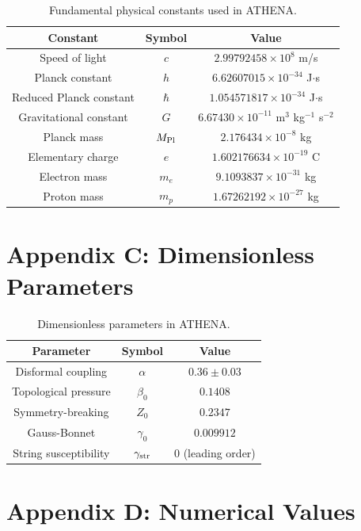 \documentclass[12pt,oneside]{book}
\begin{document}
\begin{table}[H]
\centering
\begin{tabular}{|c|c|c|}
\hline
\textbf{Constant} & \textbf{Symbol} & \textbf{Value} \\
\hline
Speed of light & $c$ & $2.99792458 \times 10^8$ m/s \\
Planck constant & $h$ & $6.62607015 \times 10^{-34}$ J$\cdot$s \\
Reduced Planck constant & $\hbar$ & $1.054571817 \times 10^{-34}$ J$\cdot$s \\
Gravitational constant & $G$ & $6.67430 \times 10^{-11}$ m$^3$ kg$^{-1}$ s$^{-2}$ \\
Planck mass & $M_{\rm Pl}$ & $2.176434 \times 10^{-8}$ kg \\
Elementary charge & $e$ & $1.602176634 \times 10^{-19}$ C \\
Electron mass & $m_e$ & $9.1093837 \times 10^{-31}$ kg \\
Proton mass & $m_p$ & $1.67262192 \times 10^{-27}$ kg \\
\hline
\end{tabular}
\caption{Fundamental physical constants used in ATHENA.}
\end{table}

\chapter{Appendix C: Dimensionless Parameters}

\begin{table}[H]
\centering
\begin{tabular}{|c|c|c|}
\hline
\textbf{Parameter} & \textbf{Symbol} & \textbf{Value} \\
\hline
Disformal coupling & $\alpha$ & $0.36 \pm 0.03$ \\
Topological pressure & $\beta_0$ & $0.1408$ \\
Symmetry-breaking & $Z_0$ & $0.2347$ \\
Gauss-Bonnet & $\gamma_0$ & $0.009912$ \\
String susceptibility & $\gamma_{\rm str}$ & $0$ (leading order) \\
\hline
\end{tabular}
\caption{Dimensionless parameters in ATHENA.}
\end{table}

\chapter{Appendix D: Numerical Values}
\end{document}
